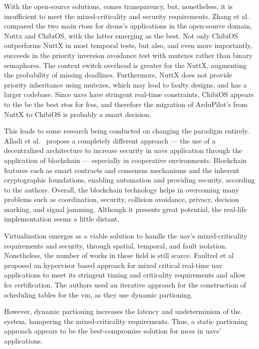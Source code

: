 With the open-source solutions, comes transparency, but, nonetheless, it is
insufficient to meet the mixed-criticality and security requirements.
Zhang et al.~\cite{zhang2021best} compared the two main \glspl{rtos} for drone's applications in the
open-source domain, Nuttx and ChibiOS, with the latter emerging as the best. Not
only ChibiOS outperforms NuttX in most temporal tests, but also, and even more
importantly, succeeds in the priority inversion avoidance test with mutexes
rather than binary semaphores. The context switch overhead is greater for
the NuttX, augmenting the probability of missing deadlines. Furthermore, NuttX
does not provide priority inheritance using mutexes, which may lead to faulty
designs, and has a larger codebase. Since \glspl{uav} have stringent real-time
constraints, ChibiOS appears to the be the best \gls{rtos} for \glspl{fcs}, and
therefore the migration of ArduPilot's from NuttX to ChibiOS is probably a smart
decision.

This leads to some research being conducted on changing the paradigm entirely.
Alladi et al.~\cite{alladi2022UAVBlockain} propose a completely different
approach --- the use of a decentralized architecture to increase security in
\glspl{uav} application through the application of blockchain --- especially in
cooperative environments. Blockchain features such as smart contracts and
consensus mechanisms and the inherent cryptographic foundations, enabling
automation and providing security, according to the authors. Overall, the
blockchain technology helps in overcoming many problems such as coordination,
security, collision avoidance, privacy, decision marking, and signal
jamming. Although it presents great potential, the real-life implementation
seems a little distant.

Virtualization emerges as a viable solution to handle the \gls{uav}'s
mixed-criticality requirements and security, through spatial, temporal, and
fault isolation. Nonetheless, the number of works in these field is still scarce.
Faultrel et al~\cite{fautrel2019hypervisor} proposed an hypervisor based
approach for mixed critical real-time \gls{uav} applications to meet its
stringent timing and criticality requirements and allow \gls{fcs}
certification. The authors used an iterative approach for the construction of
scheduling tables for the \gls{vm}, as they use dynamic partioning. 

However, dynamic partioning increases the latency and undeterminism of the
system, hampering the mixed-criticality requirements. Thus, a static partioning
approach appears to be the best-compromise solution for \glspl{mcs} in
\glspl{uav}' applications.



